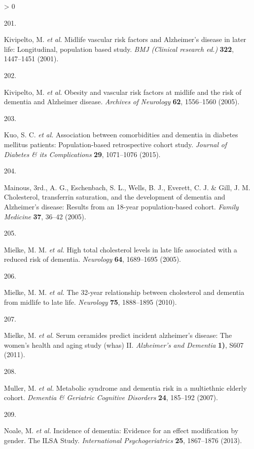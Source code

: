\documentclass[a4paper, twoside]{templates/ociamthesis}
\newlength{\cslhangindent}
\newlength{\csllabelwidth}
\newenvironment{CSLReferences}[3] %
 {%
  \setlength{\parindent}{0pt}
  \ifodd #1 \everypar{\setlength{\hangindent}{\cslhangindent}}\ignorespaces\fi
  \ifnum #2 > 0
  \setlength{\parskip}{#2\baselineskip}
  \fi
 }%
 {}
\newcommand{\CSLLeftMargin}[1]{\parbox[t]{\maxof{\widthof{#1}}{\csllabelwidth}}{#1}}
\newcommand{\CSLRightInline}[1]{\parbox[t]{\linewidth - \csllabelwidth}{#1}}
\begin{document}
\begin{CSLReferences}{0}{0}
\leavevmode\hypertarget{ref-kivipelto2001}{}%
\CSLLeftMargin{201. }
\CSLRightInline{Kivipelto, M. \emph{et al.} Midlife vascular risk factors and {Alzheimer}'s disease in later life: Longitudinal, population based study. \emph{BMJ (Clinical research ed.)} \textbf{322}, 1447--1451 (2001).}

\leavevmode\hypertarget{ref-kivipelto2005a}{}%
\CSLLeftMargin{202. }
\CSLRightInline{Kivipelto, M. \emph{et al.} Obesity and vascular risk factors at midlife and the risk of dementia and {Alzheimer} disease. \emph{Archives of Neurology} \textbf{62}, 1556--1560 (2005).}

\leavevmode\hypertarget{ref-kuo2015}{}%
\CSLLeftMargin{203. }
\CSLRightInline{Kuo, S. C. \emph{et al.} Association between comorbidities and dementia in diabetes mellitus patients: Population-based retrospective cohort study. \emph{Journal of Diabetes \& its Complications} \textbf{29}, 1071--1076 (2015).}

\leavevmode\hypertarget{ref-mainousa.g.2005}{}%
\CSLLeftMargin{204. }
\CSLRightInline{Mainous, 3rd., A. G., Eschenbach, S. L., Wells, B. J., Everett, C. J. \& Gill, J. M. Cholesterol, transferrin saturation, and the development of dementia and {Alzheimer}'s disease: Results from an 18-year population-based cohort. \emph{Family Medicine} \textbf{37}, 36--42 (2005).}

\leavevmode\hypertarget{ref-mielke2005a}{}%
\CSLLeftMargin{205. }
\CSLRightInline{Mielke, M. M. \emph{et al.} High total cholesterol levels in late life associated with a reduced risk of dementia. \emph{Neurology} \textbf{64}, 1689--1695 (2005).}

\leavevmode\hypertarget{ref-mielke2010a}{}%
\CSLLeftMargin{206. }
\CSLRightInline{Mielke, M. M. \emph{et al.} The 32-year relationship between cholesterol and dementia from midlife to late life. \emph{Neurology} \textbf{75}, 1888--1895 (2010).}

\leavevmode\hypertarget{ref-mielke2011}{}%
\CSLLeftMargin{207. }
\CSLRightInline{Mielke, M. \emph{et al.} Serum ceramides predict incident alzheimer's disease: The women's health and aging study (whas) {II}. \emph{Alzheimer's and Dementia} \textbf{1)}, S607 (2011).}

\leavevmode\hypertarget{ref-muller2007}{}%
\CSLLeftMargin{208. }
\CSLRightInline{Muller, M. \emph{et al.} Metabolic syndrome and dementia risk in a multiethnic elderly cohort. \emph{Dementia \& Geriatric Cognitive Disorders} \textbf{24}, 185--192 (2007).}

\leavevmode\hypertarget{ref-noale2013}{}%
\CSLLeftMargin{209. }
\CSLRightInline{Noale, M. \emph{et al.} Incidence of dementia: Evidence for an effect modification by gender. {The ILSA Study}. \emph{International Psychogeriatrics} \textbf{25}, 1867--1876 (2013).}


\end{CSLReferences}
\end{document}
